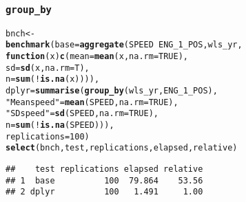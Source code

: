 \documentclass{beamer}\usepackage[]{graphicx}\usepackage[]{color}
\makeatletter
\newcommand{\hlnum}[1]{\textcolor[rgb]{0.686,0.059,0.569}{#1}}%
\newcommand{\hlstr}[1]{\textcolor[rgb]{0.192,0.494,0.8}{#1}}%
\newcommand{\hlopt}[1]{\textcolor[rgb]{0,0,0}{#1}}%
\newcommand{\hlstd}[1]{\textcolor[rgb]{0.345,0.345,0.345}{#1}}%
\newcommand{\hlkwa}[1]{\textcolor[rgb]{0.161,0.373,0.58}{\textbf{#1}}}%
\newcommand{\hlkwb}[1]{\textcolor[rgb]{0.69,0.353,0.396}{#1}}%
\newcommand{\hlkwc}[1]{\textcolor[rgb]{0.333,0.667,0.333}{#1}}%
\newcommand{\hlkwd}[1]{\textcolor[rgb]{0.737,0.353,0.396}{\textbf{#1}}}%
\newenvironment{kframe}{%
 \def\at@end@of@kframe{}%
 \ifinner\ifhmode%
  \def\at@end@of@kframe{\end{minipage}}%
  \begin{minipage}{\columnwidth}%
 \fi\fi%
 \def\FrameCommand##1{\hskip\@totalleftmargin \hskip-\fboxsep
 \colorbox{shadecolor}{##1}\hskip-\fboxsep
     \hskip-\linewidth \hskip-\@totalleftmargin \hskip\columnwidth}%
 \MakeFramed {\advance\hsize-\width
   \@totalleftmargin\z@ \linewidth\hsize
   \@setminipage}}%
 {\par\unskip\endMakeFramed%
 \at@end@of@kframe}
\newenvironment{knitrout}{}{} %
\makeatother
\begin{document}
\begin{frame}[fragile]
  \frametitle{{\tt group\_by}}
\begin{knitrout}\footnotesize
{}\color{fgcolor}\begin{kframe}
\begin{alltt}
\hlstd{bnch} \hlkwb{<-}
  \hlkwd{benchmark}\hlstd{(}\hlkwc{base} \hlstd{=} \hlkwd{aggregate}\hlstd{(SPEED} \hlopt{~} \hlstd{ENG_1_POS, wls_yr,}
                             \hlkwa{function}\hlstd{(}\hlkwc{x}\hlstd{)} \hlkwd{c}\hlstd{(}\hlkwc{mean} \hlstd{=} \hlkwd{mean}\hlstd{(x,} \hlkwc{na.rm} \hlstd{=} \hlnum{TRUE}\hlstd{),}
                                           \hlkwc{sd}   \hlstd{=} \hlkwd{sd}\hlstd{(x,} \hlkwc{na.rm} \hlstd{= T),}
                                           \hlkwc{n}    \hlstd{=} \hlkwd{sum}\hlstd{(}\hlopt{!}\hlkwd{is.na}\hlstd{(x)))),}
            \hlkwc{dplyr} \hlstd{=} \hlkwd{summarise}\hlstd{(}\hlkwd{group_by}\hlstd{(wls_yr, ENG_1_POS),}
                              \hlstr{"Mean speed"} \hlstd{=} \hlkwd{mean}\hlstd{(SPEED,} \hlkwc{na.rm} \hlstd{=} \hlnum{TRUE}\hlstd{),}
                              \hlstr{"SD speed"}   \hlstd{=} \hlkwd{sd}\hlstd{(SPEED,} \hlkwc{na.rm} \hlstd{=} \hlnum{TRUE}\hlstd{),}
                              \hlkwc{n}            \hlstd{=} \hlkwd{sum}\hlstd{(}\hlopt{!}\hlkwd{is.na}\hlstd{(SPEED))),}
            \hlkwc{replications} \hlstd{=} \hlnum{100}\hlstd{)}
\hlkwd{select}\hlstd{(bnch, test, replications, elapsed, relative)}
\end{alltt}
\begin{verbatim}
##    test replications elapsed relative
## 1  base          100  79.864    53.56
## 2 dplyr          100   1.491     1.00
\end{verbatim}
\end{kframe}
\end{knitrout}
\end{frame} 
\end{document}
